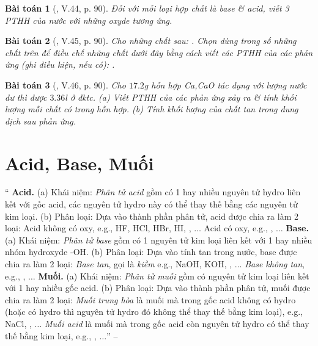\documentclass{article}
\newtheorem{baitoan}{Bài toán}
\begin{document}
\begin{baitoan}[\cite{Truong_BTNC_Hoa_Hoc_8_2022}, V.44, p. 90]
	Đối với mỗi loại hợp chất là base \& acid, viết 3 PTHH của nước với những oxyde tương ứng.
\end{baitoan}

\begin{baitoan}[\cite{Truong_BTNC_Hoa_Hoc_8_2022}, V.45, p. 90]
	Cho những chất sau: \emph{}. Chọn dùng trong số những chất trên để điều chế những chất dưới đây bằng cách viết các PTHH của các phản ứng (ghi điều kiện, nếu có): \emph{}.
\end{baitoan}

\begin{baitoan}[\cite{Truong_BTNC_Hoa_Hoc_8_2022}, V.46, p. 90]
	Cho $17.2$\emph{g} hỗn hợp \emph{Ca,CaO} tác dụng với lượng nước dư thì được $3.36$\emph{l } ở đktc. (a) Viết PTHH của các phản ứng xảy ra \& tính khối lượng mỗi chất có trong hỗn hợp. (b) Tính khối lượng của chất tan trong dung dịch sau phản ứng.
\end{baitoan}


\section{Acid, Base, Muối}
`` \textbf{Acid.} (a) Khái niệm: \textit{Phân tử acid} gồm có 1 hay nhiều nguyên tử hydro liên kết với gốc acid, các nguyên tử hydro này có thể thay thế bằng các nguyên tử kim loại. (b) Phân loại: Dựa vào thành phần phân tử, acid được chia ra làm 2 loại: Acid không có oxy, e.g., HF, HCl, HBr, HI, , $\ldots$ Acid có oxy, e.g., , $\ldots$  \textbf{Base.} (a) Khái niệm: \textit{Phân tử base} gồm có 1 nguyên tử kim loại liên kết với 1 hay nhiều nhóm hydroxyde -OH. (b) Phân loại: Dựa vào tính tan trong nước, base được chia ra làm 2 loại: \textit{Base tan}, gọi là \textit{kiềm} e.g., NaOH, KOH, , $\ldots$ \textit{Base không tan}, e.g., , $\ldots$  \textbf{Muối.} (a) Khái niệm: \textit{Phân tử muối} gồm có nguyên tử kim loại liên kết với 1 hay nhiều gốc acid. (b) Phân loại: Dựa vào thành phần phân tử, muối được chia ra làm 2 loại: \textit{Muối trung hòa} là muối mà trong gốc acid không có hydro (hoặc có hydro thì nguyên tử hydro đó không thể thay thế bằng kim loại), e.g., NaCl, , $\ldots$ \textit{Muối acid} là muối mà trong gốc acid còn nguyên tử hydro có thể thay thế bằng kim loại, e.g., , $\ldots$'' -- \cite[Chap. 5, \S4, p. 91]{Truong_BTNC_Hoa_Hoc_8_2022}
\end{document}
